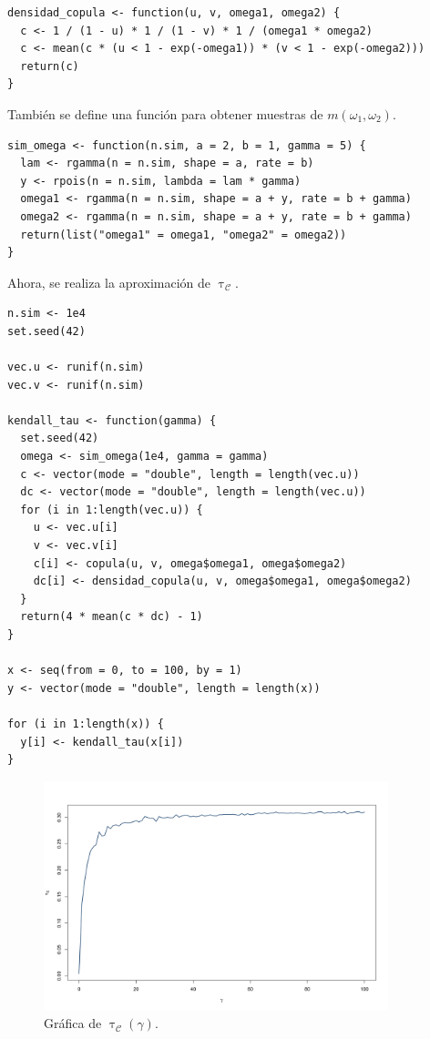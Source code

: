 \documentclass[11pt,a4paper]{article}
\begin{document}
\begin{lstlisting}
densidad_copula <- function(u, v, omega1, omega2) {
  c <- 1 / (1 - u) * 1 / (1 - v) * 1 / (omega1 * omega2)
  c <- mean(c * (u < 1 - exp(-omega1)) * (v < 1 - exp(-omega2)))
  return(c)
}
\end{lstlisting}\leavevmode\newline

También se define una función para obtener muestras de $m(\omega_1, \omega_2)$.\\

\begin{lstlisting}
sim_omega <- function(n.sim, a = 2, b = 1, gamma = 5) {
  lam <- rgamma(n = n.sim, shape = a, rate = b)
  y <- rpois(n = n.sim, lambda = lam * gamma)
  omega1 <- rgamma(n = n.sim, shape = a + y, rate = b + gamma)
  omega2 <- rgamma(n = n.sim, shape = a + y, rate = b + gamma)
  return(list("omega1" = omega1, "omega2" = omega2))
}
\end{lstlisting}

Ahora, se realiza la aproximación de $\uptau_\mathcal{C}$.\\

\begin{lstlisting}
n.sim <- 1e4
set.seed(42)

vec.u <- runif(n.sim)
vec.v <- runif(n.sim)

kendall_tau <- function(gamma) {
  set.seed(42)
  omega <- sim_omega(1e4, gamma = gamma)
  c <- vector(mode = "double", length = length(vec.u))
  dc <- vector(mode = "double", length = length(vec.u))
  for (i in 1:length(vec.u)) {
    u <- vec.u[i]
    v <- vec.v[i]
    c[i] <- copula(u, v, omega$omega1, omega$omega2)
    dc[i] <- densidad_copula(u, v, omega$omega1, omega$omega2)
  }
  return(4 * mean(c * dc) - 1)
}

x <- seq(from = 0, to = 100, by = 1)
y <- vector(mode = "double", length = length(x))

for (i in 1:length(x)) {
  y[i] <- kendall_tau(x[i])
}
\end{lstlisting}\leavevmode\newline

\begin{figure}[h]
\centering\includegraphics[width=10cm]{kendall_tau.png}
\caption{Gráfica de $\uptau_\mathcal{C} (\gamma)$.}
\label{fig:kendall_tau}
\end{figure}
\end{document}
